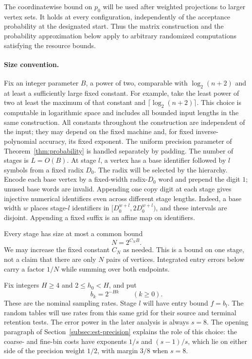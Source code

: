 The coordinatewise bound on $p_0$ will be used after weighted projections
to larger vertex sets.  It holds at every configuration, independently
of the acceptance probability at the designated start.  Thus the matrix
construction and the probability approximation below apply to arbitrary
randomized computations satisfying the resource bounds.

\paragraph{Size convention.}
Fix an integer parameter $B$, a power of two, comparable with
$\log_2(n+2)$ and at least a sufficiently large fixed constant.
For example, take the least power of two at least the maximum of that
constant and $\lceil\log_2(n+2)\rceil$.  This choice is computable in
logarithmic space and includes all bounded input lengths in the same
construction. All constants throughout the
construction are independent of the input; they may depend on the fixed
machine and, for fixed inverse-polynomial accuracy, its fixed exponent.
The uniform precision parameter of Theorem~\ref{thm:probability} is
handled separately by padding. The number of stages is $L=O(B)$. At stage $l$, a vertex has
a base identifier followed by $l$ symbols from a fixed radix $D_0$.
The radix will be selected by the hierarchy. Encode each base vertex by
a fixed-width radix-$D_0$ word and prepend the digit $1$; unused base
words are invalid. Appending one copy digit at each stage gives
injective numerical identifiers even across different stage lengths.
Indeed, a base width $w$ places stage-$l$ identifiers in
$[D_0^{w+l},2D_0^{w+l})$, and these intervals are disjoint.
Appending a fixed suffix is an affine map on identifiers.

Every stage has size at most a common bound
\[
N=2^{C_NB}.
\]
We may increase the fixed constant $C_N$ as needed. This is a bound on
one stage, not a claim that there are only $N$ pairs of vertices.
Integrated entry errors below carry a factor $1/N$ while summing over
both endpoints.

Fix integers $H\ge4$ and $2\le h_0<H$, and put
\[
b_k=2^{-Hk}\qquad(k\ge0).
\]
These are the nominal sampling rates. Stage $l$ will have entry bound
$f=b_l$. The random tables will use rates from this same grid
for their source and terminal retention tests. The error power in
the later analysis is always $s=8$.  The opening paragraph of
Section~\ref{subsec:est-precision} explains the role of this choice: the
coarse- and fine-bin costs have exponents $1/s$ and $(s-1)/s$, which lie on
either side of the precision weight $1/2$, with margin $3/8$ when $s=8$.

